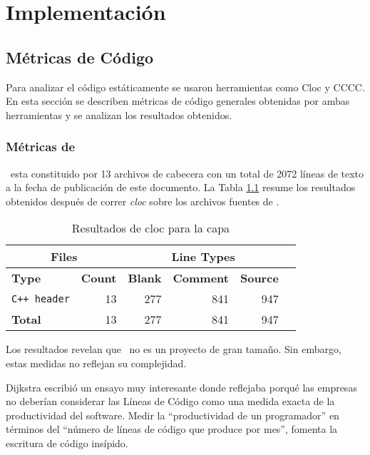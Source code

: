 \chapter{Implementaci\'on}
  \section{M\'etricas de C\'odigo}
    Para analizar el c\'odigo est\'aticamente se usaron herramientas como Cloc y CCCC. En esta secci\'on se describen m\'etricas de c\'odigo
    generales obtenidas por ambas herramientas y se analizan los resultados obtenidos.

    \subsection{M\'etricas de \combeng}
    \combeng \ esta constituido por 13 archivos de cabecera con un total de 2072 l\'ineas de texto a la fecha de publicaci\'on de
    este documento. La Tabla \ref{clocCombeng} resume los resultados obtenidos despu\'es de correr \textit{cloc} sobre los archivos fuentes de
    \combeng. 
    \begin{table}[!htf]
      \begin{center}
        \begin{tabular}{|l|r|r|r|r|c|}
          \hline
          \multicolumn{2}{|c|}{Files} & \multicolumn{3}{|c|}{Line Types} \\
          \hline
          \textbf{Type} & \textbf{Count} & \textbf{Blank} & \textbf{Comment} & \textbf{Source} \\
          \hline
          \texttt{C++ header} & 13   &  277  &  841  &  947 \\
          \hline
          \textbf{Total}      & 13   &  277  &  841  &  947 \\
          \hline
        \end{tabular}
        \caption{Resultados de cloc para la capa \combeng}\label{clocCombeng}
      \end{center}
    \end{table}
    Los resultados revelan que \combeng \ no es un proyecto de gran tama\~no. Sin embargo, estas medidas no reflejan su complejidad.

    Dijkstra escribi\'o un ensayo muy interesante\cite{ewd1036} donde reflejaba porqu\'e las empresas no deber\'ian considerar las L\'ineas de
    C\'odigo como una medida exacta de la productividad del software. Medir la ``productividad de un programador'' en t\'erminos del 
    ``n\'umero de l\'ineas de c\'odigo que produce por mes'', fomenta la escritura de c\'odigo ins\'ipido.

